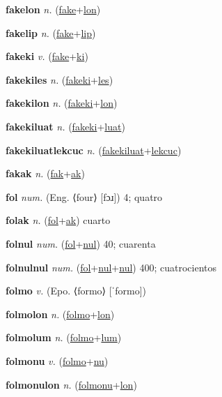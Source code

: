 \textbf{\hypertarget{fakelon}{fakelon}} \textit{n.} (\hyperlink{fake}{fake}+\allowbreak \hyperlink{lon}{lon})


\textbf{\hypertarget{fakelip}{fakelip}} \textit{n.} (\hyperlink{fake}{fake}+\allowbreak \hyperlink{lip}{lip})


\textbf{\hypertarget{fakeki}{fakeki}} \textit{v.} (\hyperlink{fake}{fake}+\allowbreak \hyperlink{ki}{ki})


\textbf{\hypertarget{fakekiles}{fakekiles}} \textit{n.} (\hyperlink{fakeki}{fakeki}+\allowbreak \hyperlink{les}{les})


\textbf{\hypertarget{fakekilon}{fakekilon}} \textit{n.} (\hyperlink{fakeki}{fakeki}+\allowbreak \hyperlink{lon}{lon})


\textbf{\hypertarget{fakekiluat}{fakekiluat}} \textit{n.} (\hyperlink{fakeki}{fakeki}+\allowbreak \hyperlink{luat}{luat})


\textbf{\hypertarget{fakekiluatlekcuc}{fakekiluatlekcuc}} \textit{n.} (\hyperlink{fakekiluat}{fakekiluat}+\allowbreak \hyperlink{lekcuc}{lekcuc})


\textbf{\hypertarget{fakak}{fakak}} \textit{n.} (\hyperlink{fak}{fak}+\allowbreak \hyperlink{ak}{ak})


\textbf{\hypertarget{fol}{fol}} \textit{num.} (Eng. ⟨four⟩ [fɔɹ])
4; quatro

\textbf{\hypertarget{folak}{folak}} \textit{n.} (\hyperlink{fol}{fol}+\allowbreak \hyperlink{ak}{ak})
cuarto

\textbf{\hypertarget{folnul}{folnul}} \textit{num.} (\hyperlink{fol}{fol}+\allowbreak \hyperlink{nul}{nul})
40; cuarenta

\textbf{\hypertarget{folnulnul}{folnulnul}} \textit{num.} (\hyperlink{fol}{fol}+\allowbreak \hyperlink{nul}{nul}+\allowbreak \hyperlink{nul}{nul})
400; cuatrocientos

\textbf{\hypertarget{folmo}{folmo}} \textit{v.} (Epo. ⟨formo⟩ [ˈformo])


\textbf{\hypertarget{folmolon}{folmolon}} \textit{n.} (\hyperlink{folmo}{folmo}+\allowbreak \hyperlink{lon}{lon})


\textbf{\hypertarget{folmolum}{folmolum}} \textit{n.} (\hyperlink{folmo}{folmo}+\allowbreak \hyperlink{lum}{lum})


\textbf{\hypertarget{folmonu}{folmonu}} \textit{v.} (\hyperlink{folmo}{folmo}+\allowbreak \hyperlink{nu}{nu})


\textbf{\hypertarget{folmonulon}{folmonulon}} \textit{n.} (\hyperlink{folmonu}{folmonu}+\allowbreak \hyperlink{lon}{lon})


